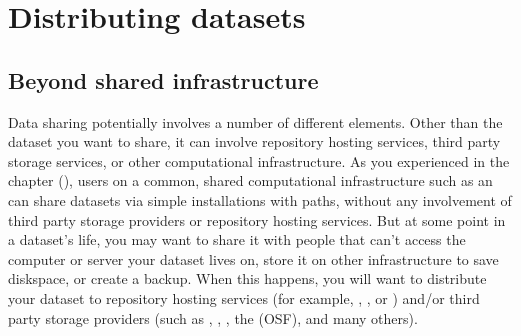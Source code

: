 \chapter{Distributing datasets}
\label{\detokenize{basics/basics-thirdparty:distributing-datasets}}\label{\detokenize{basics/basics-thirdparty:chapter-thirdparty}}\label{\detokenize{basics/basics-thirdparty::doc}}

\sphinxstepscope


\section{Beyond shared infrastructure}
\label{\detokenize{basics/101-138-sharethirdparty:beyond-shared-infrastructure}}\label{\detokenize{basics/101-138-sharethirdparty:sharethirdparty}}\label{\detokenize{basics/101-138-sharethirdparty::doc}}
\sphinxAtStartPar
Data sharing potentially involves a number of different elements.
Other than the dataset you want to share, it can involve repository hosting services, third party storage services, or other computational infrastructure.
As you experienced in the chapter {\hyperref[\detokenize{basics/basics-collaboration:chapter-collaboration}]{}} (), users on a common, shared computational infrastructure such as an {\hyperref[\detokenize{glossary:term-SSH-server}]{}}
can share datasets via simple installations with paths, without any involvement of third party storage providers or repository hosting services.
But at some point in a dataset’s life, you may want to share it with people that
can’t access the computer or server your dataset lives on, store it on other infrastructure
to save diskspace, or create a backup.
When this happens, you will want to distribute your dataset to repository hosting
services (for example, {\hyperref[\detokenize{glossary:term-GitHub}]{}}, {\hyperref[\detokenize{glossary:term-GitLab}]{}}, or {\hyperref[\detokenize{glossary:term-GIN}]{}})
and/or third party storage providers (such as , ,
,
the  (OSF), and many others).

